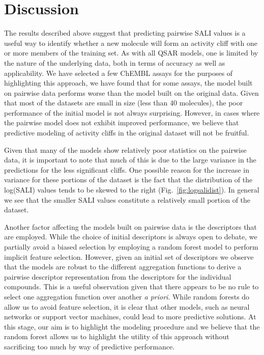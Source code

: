 \documentclass[letterpaper, 12pt]{article}
\begin{document}
\section{Discussion}
\label{sec:discussion}

The results described above suggest that predicting pairwise SALI values is a useful way to identify
whether a new molecule will form an activity cliff with one or more members of the training set. As
with all QSAR models, one is limited by the nature of the underlying data, both in terms of accuracy
as well as applicability. We have selected a few ChEMBL assays for the purposes of
highlighting this approach, we have found that for some assays, the model built on pairwise data
performs worse than the model built on the original data. Given that most of the datasets are small
in size (less than 40 molecules), the poor performance of the initial model is not always
surprising. However, in cases where the pairwise model does not exhibit improved performance, we
believe that predictive modeling of activity cliffs in the original dataset will not be fruitful.

Given that many of the models show relatively poor statistics on the pairwise data, it is important
to note that much of this is due to the large variance in the predictions for the less significant
cliffs. One possible reason for the increase in variance for these portions of the dataset is the
fact that the distribution of the log(SALI) values tends to be skewed to the right
(Fig.~\ref{fig:logsalidist}). In general we see that the smaller SALI values constitute a relatively
small portion of the dataset.

Another factor affecting the models built on pairwise data is the descriptors that are
employed. While the choice of initial descriptors is always open to debate, we partially avoid a
biased selection by employing a random forest model to perform implicit feature selection. However,
given an initial set of descriptors we observe that the models are robust to the different
aggregation functions to derive a pairwise descriptor representation from the descriptors for the
individual compounds. This is a useful observation given that there appears to be no rule to select
one aggregation function over another \emph{a priori}. While random forests do allow us to avoid
feature selection, it is clear that other models, such as neural networks or support vector
machines, could lead to more predictive solutions. At this stage, our aim is to highlight the
modeling procedure and we believe that the random forest allows us to highlight the utility of this
approach without sacrificing too much by way of predictive performance.
\end{document}
